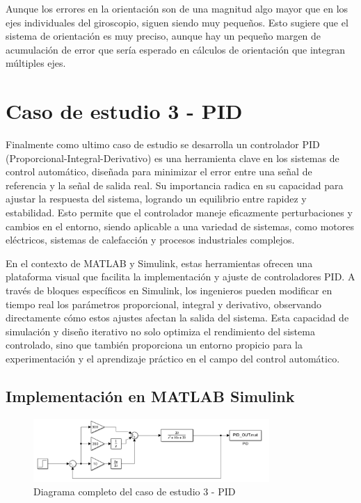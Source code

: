 Aunque los errores en la orientación son de una magnitud algo mayor que en los ejes individuales del giroscopio, siguen siendo muy pequeños. Esto sugiere que el sistema de orientación es muy preciso, aunque hay un pequeño margen de acumulación de error que sería esperado en cálculos de orientación que integran múltiples ejes. 

\newpage

\section{Caso de estudio 3 - PID}

Finalmente como ultimo caso de estudio se desarrolla un controlador PID (Proporcional-Integral-Derivativo) es una herramienta clave en los sistemas de control automático, diseñada para minimizar el error entre una señal de referencia y la señal de salida real. Su importancia radica en su capacidad para ajustar la respuesta del sistema, logrando un equilibrio entre rapidez y estabilidad. Esto permite que el controlador maneje eficazmente perturbaciones y cambios en el entorno, siendo aplicable a una variedad de sistemas, como motores eléctricos, sistemas de calefacción y procesos industriales complejos.

En el contexto de MATLAB y Simulink, estas herramientas ofrecen una plataforma visual que facilita la implementación y ajuste de controladores PID. A través de bloques específicos en Simulink, los ingenieros pueden modificar en tiempo real los parámetros proporcional, integral y derivativo, observando directamente cómo estos ajustes afectan la salida del sistema. Esta capacidad de simulación y diseño iterativo no solo optimiza el rendimiento del sistema controlado, sino que también proporciona un entorno propicio para la experimentación y el aprendizaje práctico en el campo del control automático.


\subsection{Implementación en MATLAB Simulink}

\begin{figure}[h!]
    \centering
    \includegraphics[width=0.8\textwidth]{fig/Capitulo5/Caso_de_estudio_PID/PID_Diagram.pdf}
    \caption{Diagrama completo del caso de estudio 3 - PID }
    \label{fig:caso_de_estudio_3_PID}
\end{figure}


